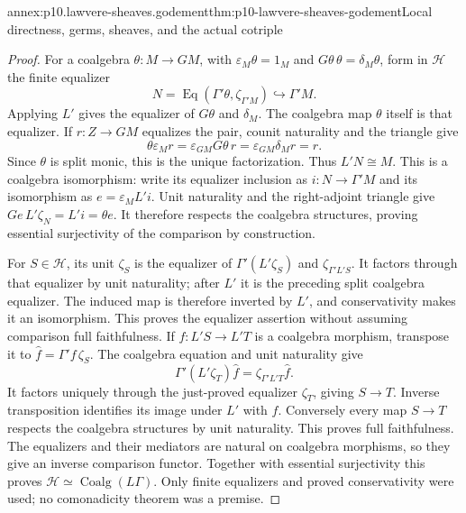 \begin{annexitem}{annex:p10.lawvere-sheaves.godement}{thm:p10-lawvere-sheaves-godement}{Local directness, germs, sheaves, and the actual cotriple}
\begin{proof}
For a coalgebra \(\theta:M\to GM\), with
\(\varepsilon_M\theta=1_M\) and
\(G\theta\,\theta=\delta_M\theta\), form
in \(\mathcal H\) the finite equalizer
\[
             N=\operatorname{Eq}
                    (\Gamma'\theta,\zeta_{\Gamma'M})
                            \hookrightarrow\Gamma'M.
\]
Applying \(L'\) gives the equalizer of
\(G\theta\) and \(\delta_M\).
The coalgebra map \(\theta\) itself is that
equalizer.  If \(r:Z\to GM\) equalizes
the pair, counit naturality and the triangle
give
\[
 \theta\varepsilon_Mr
     =\varepsilon_{GM}G\theta\,r
     =\varepsilon_{GM}\delta_Mr=r.
\]
Since \(\theta\) is split monic, this is
the unique factorization.  Thus \(L'N\cong M\).
This is a coalgebra isomorphism: write its equalizer
inclusion as \(i:N\to\Gamma'M\) and its isomorphism
as \(e=\varepsilon_M L'i\).  Unit naturality and
the right-adjoint triangle give
\(Ge\,L'\zeta_N=L'i=\theta e\).
It therefore respects the coalgebra structures, proving essential
surjectivity of the comparison by construction.

For \(S\in\mathcal H\), its unit \(\zeta_S\)
is the equalizer of
\(\Gamma'(L'\zeta_S)\) and
\(\zeta_{\Gamma'L'S}\).  It factors through
that equalizer by unit naturality; after \(L'\)
it is the preceding split coalgebra equalizer.
The induced map is therefore inverted by
\(L'\), and conservativity makes it an
isomorphism.  This proves the equalizer assertion
without assuming comparison full faithfulness.
If \(f:L'S\to L'T\) is a coalgebra morphism,
transpose it to \(\widehat f=\Gamma'f\,\zeta_S\).
The coalgebra equation and unit naturality give
\[
       \Gamma'(L'\zeta_T)\widehat f
                         =\zeta_{\Gamma'L'T}\widehat f.
\]
It factors uniquely through the just-proved
equalizer \(\zeta_T\), giving \(S\to T\).
Inverse transposition identifies its image
under \(L'\) with \(f\).  Conversely every
map \(S\to T\) respects the coalgebra
structures by unit naturality.  This proves
full faithfulness.  The equalizers and their
mediators are natural on coalgebra morphisms,
so they give an inverse comparison functor.
Together with essential surjectivity this
proves \(\mathcal H\simeq\operatorname{Coalg}(L\Gamma)\).
Only finite equalizers and proved conservativity
were used; no comonadicity theorem was a premise.


\end{proof}
\end{annexitem}
